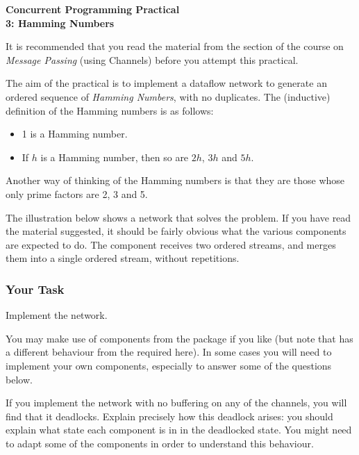 \documentclass{../csopractical}
\begin{document}
\begin{center}
\Large\bf Concurrent Programming Practical 
\\
3: Hamming Numbers 
\end{center}

It is recommended that you read the material from the section of the course on
\emph{Message Passing} (using Channels) before you attempt this practical.

The aim of the practical is to  implement a dataflow network to generate
an ordered sequence of \textit{Hamming Numbers}, with no duplicates.
The (inductive) definition of the Hamming numbers is as follows:
%
\begin{itemize}
\item 1 is a Hamming number.
\item If $h$ is a Hamming number, then so are $2h$, $3h$ and $5h$.
\end{itemize}
%
Another way of thinking of the Hamming numbers is that they are those whose
only prime factors are 2, 3 and 5.

The illustration below shows a network that solves the problem. If you
have read the material suggested, it should be fairly obvious what the
various components are expected to do.  The component  receives
two ordered streams, and merges them into a single ordered stream, without
repetitions. 

\begin{center}
\end{center}

\subsubsection*{Your Task}
Implement the network.  

You may make use of components from the package
 if you like (but note that
 has a different behaviour from the
 required here).  In some cases you will need to
implement your own components, especially to answer some of the questions
below. 

If you implement the network with no buffering on any of the channels, you
will find that it deadlocks.  Explain precisely how this deadlock
arises: you should explain what state each component is in in the deadlocked
state.  You might need to adapt some of the components in order to understand
this behaviour.
\end{document}
